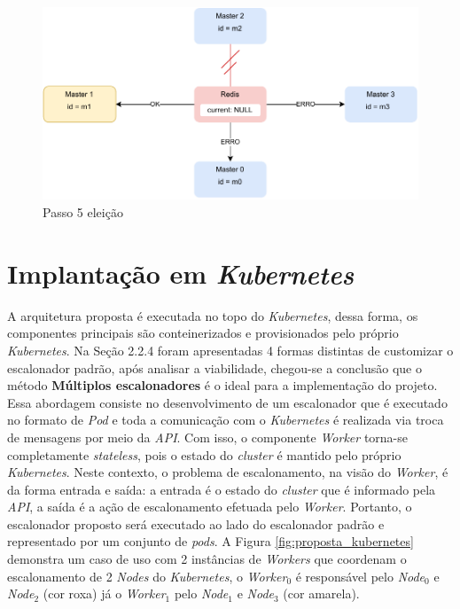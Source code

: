 \documentclass[
	12pt,				%
	openright,			%
	oneside,			%
	a4paper,			%
	brazil				%
	]{abntex2}
\begin{document}
\begin{figure}[h!]
	\caption{\label{fig:eleicao-passo-5}Passo 5 eleição}
	\centering
	\includegraphics[width=.6\linewidth]{assets/eleicao-passo-5.pdf}
\end{figure}



\newpage
\section{Implantação em \textit{Kubernetes}}
A arquitetura proposta é executada no topo do \textit{Kubernetes}, dessa forma, os componentes principais são conteinerizados e provisionados pelo próprio \textit{Kubernetes}. Na Seção 2.2.4 foram apresentadas 4 formas distintas de customizar o escalonador padrão, após analisar a viabilidade, chegou-se a conclusão que o método \textbf{Múltiplos escalonadores} é o ideal para a implementação do projeto. Essa abordagem consiste no desenvolvimento de um escalonador que é executado no formato de \textit{Pod} e toda a comunicação com o \textit{Kubernetes} é realizada via troca de mensagens por meio da \textit{API}. Com isso, o componente \textit{Worker} torna-se completamente \textit{stateless}, pois o estado do \textit{cluster} é mantido pelo próprio \textit{Kubernetes}. Neste contexto, o problema de escalonamento, na visão do \textit{Worker}, é da forma entrada e saída: a entrada é o estado do \textit{cluster} que é informado pela \textit{API}, a saída é a ação de escalonamento efetuada pelo \textit{Worker}. Portanto, o escalonador proposto será executado ao lado do escalonador padrão e representado por um conjunto de \textit{pods}. A Figura \ref{fig:proposta_kubernetes} demonstra um caso de uso com 2 instâncias de \textit{Workers} que coordenam o escalonamento de 2 \textit{Nodes} do \textit{Kubernetes}, o \textit{Worker$_0$} é responsável pelo \textit{Node$_0$} e \textit{Node$_2$} (cor roxa) já o \textit{Worker$_1$} pelo \textit{Node$_1$} e \textit{Node$_3$} (cor amarela).
\end{document}
